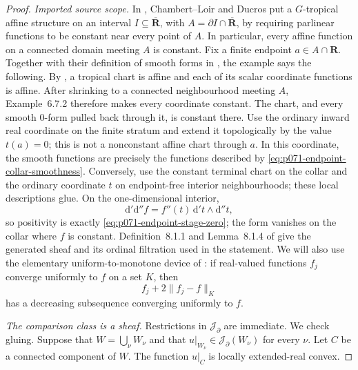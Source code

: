 
\begin{proof}
\medskip\noindent\emph{Imported source scope.}
In \cite[Example~6.7.2]{CLD25}, Chambert--Loir and Ducros put a
\(G\)-tropical affine structure on an interval
\(I\subseteq\overline{\mathbf R}\), with
\(A=\partial I\cap\overline{\mathbf R}\), by requiring parlinear functions
to be constant near every point of \(A\).  In particular, every affine
function on a connected domain meeting \(A\) is constant.  Fix a finite
endpoint \(a\in A\cap\mathbf R\).  Together with their definition of smooth
forms in \cite[Definition~6.2.1]{CLD25}, the example says the following.
By \cite[\S\S6.1.1 and 6.1.6]{CLD25}, a tropical chart is affine and each of
its scalar coordinate functions is affine.  After shrinking to a connected
neighbourhood meeting \(A\), Example~6.7.2 therefore makes every coordinate
constant.  The chart, and every smooth \(0\)-form pulled back through it, is
constant there.  Use the ordinary inward real coordinate on the finite
stratum and extend it topologically by the value \(t(a)=0\); this is not a
nonconstant affine chart through \(a\).  In this coordinate, the smooth
functions are precisely the functions described by
\eqref{eq:p071-endpoint-collar-smoothness}.  Conversely, use the constant
terminal chart on the collar and the ordinary coordinate \(t\) on
endpoint-free interior neighbourhoods; these local descriptions glue.  On
the one-dimensional interior,
\[
 \mathrm d'\mathrm d'' f
   =f''(t)\,\mathrm d't\wedge\mathrm d''t,
\]
so positivity is exactly \eqref{eq:p071-endpoint-stage-zero}; the form
vanishes on the collar where \(f\) is constant.  Definition~8.1.1 and
Lemma~8.1.4 of \cite{CLD25} give the generated sheaf and its ordinal
filtration used in the statement.  We will also use the elementary
uniform-to-monotone device of \cite[Lemma~8.1.10]{CLD25}: if real-valued
functions \(f_j\) converge uniformly to \(f\) on a set \(K\), then
\[
                  f_j+2\lVert f_j-f\rVert_{K}
\]
has a decreasing subsequence converging uniformly to \(f\).

\medskip\noindent\emph{The comparison class is a sheaf.}
Restrictions in \(\mathscr J_{\partial}\) are immediate.  We check
gluing.  Suppose that \(W=\bigcup_{\nu}W_\nu\) and that
\(u|_{W_\nu}\in\mathscr J_{\partial}(W_\nu)\) for every \(\nu\).  Let
\(C\) be a connected component of \(W\).  The function \(u|_C\) is locally
extended-real convex.


\end{proof}
